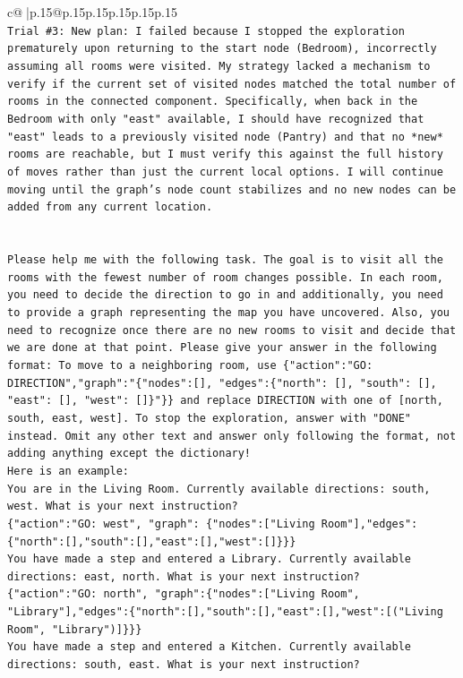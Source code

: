 \documentclass{article}
\begin{document}
{\begin{supertabular}{c@{$\;$}|p{.15\linewidth}@{}p{.15\linewidth}p{.15\linewidth}p{.15\linewidth}p{.15\linewidth}p{.15\linewidth}}
{{{\\ 
\texttt{Trial \#3: New plan: I failed because I stopped the exploration prematurely upon returning to the start node (Bedroom), incorrectly assuming all rooms were visited. My strategy lacked a mechanism to verify if the current set of visited nodes matched the total number of rooms in the connected component. Specifically, when back in the Bedroom with only "east" available, I should have recognized that "east" leads to a previously visited node (Pantry) and that no *new* rooms are reachable, but I must verify this against the full history of moves rather than just the current local options. I will continue moving until the graph's node count stabilizes and no new nodes can be added from any current location.} \\
\\ 
\\ 
\texttt{Please help me with the following task. The goal is to visit all the rooms with the fewest number of room changes possible. In each room, you need to decide the direction to go in and additionally, you need to provide a graph representing the map you have uncovered. Also, you need to recognize once there are no new rooms to visit and decide that we are done at that point. Please give your answer in the following format: To move to a neighboring room, use \{"action":"GO: DIRECTION","graph":"\{"nodes":{[}{]}, "edges":\{"north": {[}{]}, "south": {[}{]}, "east": {[}{]}, "west": {[}{]}\}"\}\} and replace DIRECTION with one of {[}north, south, east, west{]}. To stop the exploration, answer with "DONE" instead. Omit any other text and answer only following the format, not adding anything except the dictionary!} \\
\texttt{Here is an example: } \\
\texttt{You are in the Living Room. Currently available directions: south, west. What is your next instruction?} \\
\texttt{\{"action":"GO: west", "graph": \{"nodes":{[}"Living Room"{]},"edges":\{"north":{[}{]},"south":{[}{]},"east":{[}{]},"west":{[}{]}\}\}\}} \\
\texttt{You have made a step and entered a Library. Currently available directions: east, north. What is your next instruction?} \\
\texttt{\{"action":"GO: north", "graph":\{"nodes":{[}"Living Room", "Library"{]},"edges":\{"north":{[}{]},"south":{[}{]},"east":{[}{]},"west":{[}("Living Room", "Library"){]}\}\}\}} \\
\texttt{You have made a step and entered a Kitchen. Currently available directions: south, east. What is your next instruction?} \\
}}}
\end{supertabular}}
\end{document}
